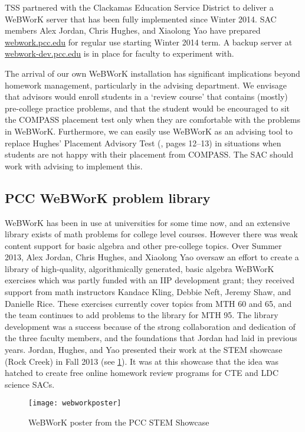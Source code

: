 TSS partnered with the Clackamas Education Service District to deliver a WeBWorK server that has been fully implemented since Winter 2014.
SAC members Alex Jordan, Chris Hughes, and Xiaolong Yao have prepared \href{http://webwork.pcc.edu}{webwork.pcc.edu} for regular use starting Winter 2014 term.
A backup server at \href{http://webwork-dev.pcc.edu}{webwork-dev.pcc.edu} is in place for faculty to experiment with.

The arrival of our own WeBWorK installation has significant implications beyond homework management, particularly in the advising department.
We envisage that advisors would enroll students in a `review course' that contains (mostly) pre-college practice problems, and that the student would be encouraged to sit the COMPASS placement test only when they are comfortable with the problems in WeBWorK.
Furthermore, we can easily use WeBWorK as an advising tool to replace Hughes' Placement Advisory Test (\cite{mathprogramreview2003}, pages 12--13) in situations when students are not happy with their placement from COMPASS.
The SAC should work with advising to implement this.

\subsection{PCC WeBWorK problem library}
WeBWorK has been in use at universities for some time now, and an extensive library exists of math problems for college level courses.
However there was weak content support for basic algebra and other pre-college topics.
Over Summer 2013, Alex Jordan, Chris Hughes, and Xiaolong Yao oversaw an effort to create a library of high-quality, algorithmically generated, basic algebra WeBWorK exercises which was partly funded with an IIP development grant; they received support from math instructors Kandace Kling, Debbie Neft, Jeremy Shaw, and Danielle Rice.
These exercises currently cover topics from MTH 60 and 65, and the team continues to add problems to the library for MTH 95.
The library development was a success because of the strong collaboration and dedication of the three faculty members, and the foundations that Jordan had laid in previous years.
Jordan, Hughes, and Yao presented their work at the STEM showcase (Rock Creek) in Fall 2013 (see \cref{webworkposter}).
It was at this showcase that the idea was hatched to create free online homework review programs for CTE and LDC science SACs.

\begin{figure}[!htb]
	\centering
	\texttt{[image: webworkposter]}
	\caption{WeBWorK poster from the PCC STEM Showcase}\label{webworkposter}
\end{figure}

